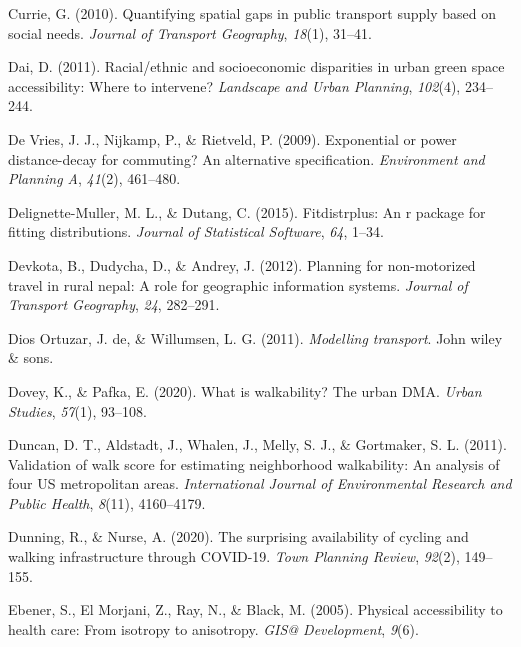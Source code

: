 \documentclass[
11pt, %
oneside, %
english, %
singlespacing, %
]{macthesis} %
\newlength{\cslhangindent}
\newenvironment{CSLReferences}[2] %
 {%
  \setlength{\parindent}{0pt}
  \ifodd #1 \everypar{\setlength{\hangindent}{\cslhangindent}}\ignorespaces\fi
  \ifnum #2 > 0
  \setlength{\parskip}{#2\baselineskip}
  \fi
 }%
 {}
\begin{document}
\begin{CSLReferences}{1}{0}
\leavevmode{}%
Currie, G. (2010). Quantifying spatial gaps in public transport supply based on social needs. \emph{Journal of Transport Geography}, \emph{18}(1), 31--41.

\leavevmode{}%
Dai, D. (2011). Racial/ethnic and socioeconomic disparities in urban green space accessibility: Where to intervene? \emph{Landscape and Urban Planning}, \emph{102}(4), 234--244.

\leavevmode{}%
De Vries, J. J., Nijkamp, P., \& Rietveld, P. (2009). Exponential or power distance-decay for commuting? An alternative specification. \emph{Environment and Planning A}, \emph{41}(2), 461--480.

\leavevmode{}%
Delignette-Muller, M. L., \& Dutang, C. (2015). Fitdistrplus: An r package for fitting distributions. \emph{Journal of Statistical Software}, \emph{64}, 1--34.

\leavevmode{}%
Devkota, B., Dudycha, D., \& Andrey, J. (2012). Planning for non-motorized travel in rural nepal: A role for geographic information systems. \emph{Journal of Transport Geography}, \emph{24}, 282--291.

\leavevmode{}%
Dios Ortuzar, J. de, \& Willumsen, L. G. (2011). \emph{Modelling transport}. John wiley \& sons.

\leavevmode{}%
Dovey, K., \& Pafka, E. (2020). What is walkability? The urban DMA. \emph{Urban Studies}, \emph{57}(1), 93--108.

\leavevmode{}%
Duncan, D. T., Aldstadt, J., Whalen, J., Melly, S. J., \& Gortmaker, S. L. (2011). Validation of walk score for estimating neighborhood walkability: An analysis of four US metropolitan areas. \emph{International Journal of Environmental Research and Public Health}, \emph{8}(11), 4160--4179.

\leavevmode{}%
Dunning, R., \& Nurse, A. (2020). The surprising availability of cycling and walking infrastructure through COVID-19. \emph{Town Planning Review}, \emph{92}(2), 149--155.

\leavevmode{}%
Ebener, S., El Morjani, Z., Ray, N., \& Black, M. (2005). Physical accessibility to health care: From isotropy to anisotropy. \emph{GIS@ Development}, \emph{9}(6).


\end{CSLReferences}
\end{document}
